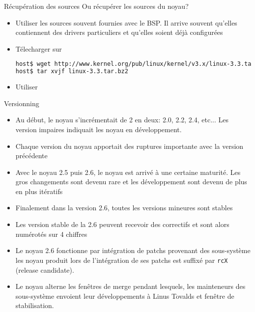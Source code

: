 \begin{frame}[fragile=singleslide]{Récupération des sources}
  Ou récupérer les sources du noyau?
  \begin{itemize} 
  \item Utiliser les sources souvent  fournies avec le BSP.  Il arrive
    souvent qu'elles contiennent  des drivers particuliers et qu'elles
    soient déjà configurées
  \item Télecharger sur 
    \begin{lstlisting}[language=sh]
host$ wget http://www.kernel.org/pub/linux/kernel/v3.x/linux-3.3.tar.bz2
host$ tar xvjf linux-3.3.tar.bz2
    \end{lstlisting}
  \item Utiliser 
  \end{itemize} 
\end{frame} 

\begin{frame}[fragile=singleslide]{Versionning}
  \begin{itemize}
  \item Au début, le noyau s'incrémentait de 2 en deux: 2.0, 2.2, 2.4,
    etc... Les version impaires indiquait les noyau en développement.
  \item Chaque version du noyau apportait des ruptures importante avec
    la version précédente
  \item Avec le noyau 2.5 puis 2.6, le noyau est arrivé à une certaine
    maturité.   Les  gros   changements  sont   devenu  rare   et  les
    développement sont devenu de plus en plus itératifs
  \item Finalement  dans la version 2.6, toutes  les versions mineures
    sont stables
  \item Les version  stable de la 2.6 peuvent  recevoir des correctifs
    et sont alors numérotés sur 4 chiffres
  \item Le  noyau 2.6 fonctionne  par intégration de  patchs provenant
    des sous-système  les noyau produit  lors de l'intégration  de ses
    patchs est suffixé par \texttt{rcX} (release candidate).
  \item Le noyau  alterne les fenêtres de merge  pendant lesquels, les
    mainteneurs des sous-système  envoient leur développements à Linus
    Tovalds et fenêtre de stabilisation.
  \end{itemize}
\end{frame}

